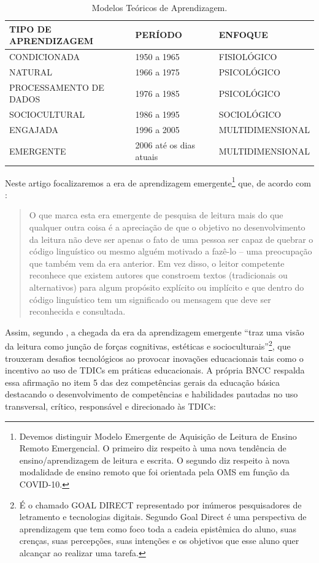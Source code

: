 \documentclass{textolivre}
\begin{document}
\begin{table}[htbp]
\caption{Modelos Teóricos de Aprendizagem.}
\label{tbl01}
\centering
\begin{tabular}{lll}
\toprule
TIPO DE APRENDIZAGEM & PERÍODO & ENFOQUE \\ 
\midrule
CONDICIONADA           & 1950 a 1965             & FISIOLÓGICO      \\ %
NATURAL                & 1966 a 1975             & PSICOLÓGICO      \\ %
PROCESSAMENTO DE DADOS & 1976 a 1985             & PSICOLÓGICO      \\ %
SOCIOCULTURAL          & 1986 a 1995             & SOCIOLÓGICO      \\ %
ENGAJADA               & 1996 a 2005             & MULTIDIMENSIONAL \\ %
EMERGENTE              & 2006 até os dias atuais & MULTIDIMENSIONAL \\ \bottomrule
\end{tabular}
\end{table}

Neste artigo focalizaremos a era de aprendizagem emergente\footnote{Devemos distinguir Modelo Emergente de Aquisição de Leitura de Ensino Remoto Emergencial. O primeiro diz respeito à uma nova tendência de ensino/aprendizagem de leitura e escrita. O segundo diz respeito à nova modalidade de ensino remoto que foi orientada pela OMS em função da COVID-10.} que, de acordo com \textcite[p. 28, tradução do autor]{alexander_2004}: 

\begin{quote}
    O que marca esta era emergente de pesquisa de leitura mais do que qualquer outra coisa é a apreciação de que o objetivo no desenvolvimento da leitura não deve ser apenas o fato de uma pessoa ser capaz de quebrar o código linguístico ou mesmo alguém motivado a fazê-lo – uma preocupação que também vem da era anterior. Em vez disso, o leitor competente reconhece que existem autores que constroem textos (tradicionais ou alternativos) para algum propósito explícito ou implícito e que dentro do código linguístico tem um significado ou mensagem que deve ser reconhecida e consultada. 
\end{quote}

Assim, segundo \textcite[p. 64]{alexander_2004}, a chegada da era da aprendizagem emergente “traz uma visão da leitura como junção de forças cognitivas, estéticas e socioculturais”\footnote{É o chamado GOAL DIRECT representado por inúmeros pesquisadores de letramento e tecnologias digitais. Segundo \textcite[p. 31]{alexander_2004} Goal Direct é uma perspectiva de aprendizagem que tem como foco toda a cadeia epistêmica do aluno, suas crenças, suas percepções, suas intenções e os objetivos que esse aluno quer alcançar ao realizar uma tarefa.}, que trouxeram desafios tecnológicos ao provocar inovações educacionais tais como o incentivo ao uso de TDICs em práticas educacionais. A própria BNCC  \cite{brasil_base_2017} respalda essa afirmação no item 5 das dez competências gerais da educação básica destacando o desenvolvimento de competências e habilidades pautadas no uso transversal, crítico, responsável e direcionado às TDICs: 
\end{document}
